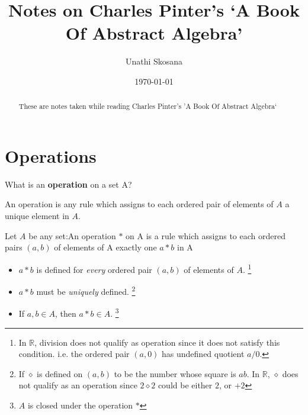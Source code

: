 \documentclass[nohyper,nobib]{tufte-handout}
\title{Notes on Charles Pinter's `A Book Of Abstract Algebra'} %
\author{Unathi Skosana}
\date{\vspace{-5pt}\normalsize \today} %
\begin{document}
\justifying 
\maketitle

\begin{abstract}
\noindent
These are notes taken while reading Charles Pinter's 'A Book Of Abstract Algebra`
\end{abstract}

\tableofcontents

\section{Operations}

\begin{quest}
	What is an \textbf{operation} on a set A?
\end{quest}

\begin{defns}
    An operation is any rule which assigns to each ordered pair of elements of $A$ a unique element in $A$.
\end{defns}

\begin{defns}
	Let $A$ be any set:\newline An operation $*$ on A is a rule which assigns to each ordered pairs $(a,b)$ of elements of A exactly one $a * b$ in A
    \begin{itemize}
        \item $a * b$ is defined for \emph{every} ordered pair $(a,b)$ of elements of $A$. \footnote{In $\mathbb{R}$, division does not qualify as operation since it does not satisfy this condition. i.e. the ordered pair $(a, 0)$ has undefined quotient $a / 0$.}
        \item $a * b$ must be \emph{uniquely} defined. \footnote{If $\diamond$ is defined on $(a, b)$ to be the number whose square is $ab$. In $\mathbb{R}$, $\diamond$ does not qualify as an operation since $2 \diamond 2$  could be either $2$, or $+2$}
        \item If $a, b \in A$, then $a * b \in A$. \footnote{$A$ is closed under the operation $*$}
    \end{itemize}
\end{defns}
\end{document}
